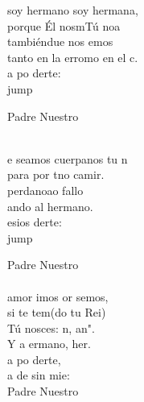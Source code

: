 \begin{cancion}%
	 soy hermano soy  hermana,\\
	porque Él nosmTú noa\\
	tambiéndue nos emos\\
	tanto en la erromo en el c.\\
	a po derte:\\jump\\
	\begin{chorus}%
	Padre Nuestro   \\
	\end{chorus}%
	\jump\\
	e seamos cuerpanos tu n \\
	para por tno camir.\\
	perdanoao fallo\\
	ando al hermano.\\
	esios derte:\\jump\\
	\begin{chorus}%
	Padre Nuestro   \\
	\jump\\
	 amor imos or semos,\\
	si te tem(do tu Rei)\\
	Tú nosces: n, an".  \\
	Y a ermano, her.\\
	a po derte,\\
	a de sin mie:\\
	Padre Nuestro   \\
	\end{chorus}%
	\jump\\
\end{cancion}%
